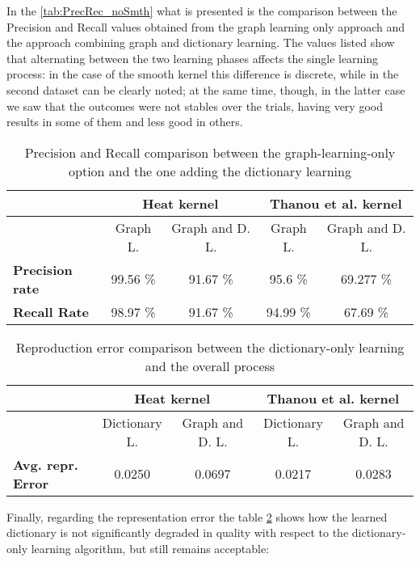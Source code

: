 In the \autoref{tab:PrecRec_noSmth} what is presented is the comparison between the Precision and Recall values obtained from the graph learning only approach and the approach combining graph and dictionary learning. The values listed show that alternating between the two learning phases affects the single learning process: in the case of the smooth kernel this difference is discrete, while in the second dataset can be clearly noted; at the same time, though, in the latter case we saw that the outcomes were not stables over the trials, having very good results in some of them and less good in others.

\begin{table}[htbp]
  \centering
  \begin{tabular}{lcccc}
  &\multicolumn{2}{c}{\textbf{Heat kernel}}&\multicolumn{2}{c}{\textbf{Thanou et al. kernel}}\\
  \toprule
  &Graph L. & Graph and D. L. & Graph L. & Graph and D. L.\\ %
    \midrule
    \textbf{Precision rate} & 99.56 \% & 91.67 \% & 95.6 \% & 69.277 \%\\
    \textbf{Recall Rate} & 98.97 \% &  91.67 \% & 94.99 \% & 67.69 \%\\
    \bottomrule
  \end{tabular}
  \caption{Precision and Recall comparison between the graph-learning-only option and the one adding the dictionary learning}
  \label{tab:PrecRec_noSmth}
\end{table}

\begin{table}[ht]
  \centering
  \begin{tabular}{lcccc}
  &\multicolumn{2}{c}{\textbf{Heat kernel}}&\multicolumn{2}{c}{\textbf{Thanou et al. kernel}}\\
  \toprule
  &Dictionary L. & Graph and D. L. & Dictionary L. & Graph and D. L.\\ %
    \midrule
    \textbf{Avg. repr. Error} & 0.0250 & 0.0697 & 0.0217 & 0.0283\\
    \bottomrule
  \end{tabular}
  \caption{Reproduction error comparison between the dictionary-only learning and the overall process}
  \label{tab:errorGD}
\end{table}

Finally, regarding the representation error the table \ref{tab:errorGD} shows how the learned dictionary is not significantly degraded in quality with respect to the dictionary-only learning algorithm, but still remains acceptable:
